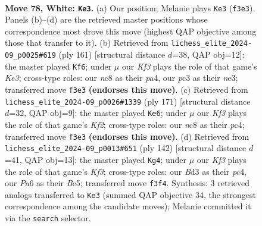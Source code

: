 \documentclass[11pt]{article}
\begin{document}
\clearpage

\begin{figure}[p]\centering
\begin{subfigure}{0.46\textwidth}\centering
\resizebox{\linewidth}{!}{%
\newchessgame
\chessboard[
  setfen={1Rnk4/r7/P1P5/7p/8/2pB1KPP/2P5/8 w - - 1 78},
  showmover=false,
  pgfstyle=straightmove, color=movearrow, markmove={f3-e3}
]}
\caption{}
\end{subfigure}\hfill
\begin{subfigure}{0.46\textwidth}\centering
\resizebox{\linewidth}{!}{%
\newchessgame
\chessboard[
  setfen={8/7p/p3k2P/R7/PP2p3/2KbN3/r7/8 b - - 3 81},
  showmover=false,
  pgfstyle=straightmove, color=movearrow, markmove={e6-f6}
]}
\caption{}
\end{subfigure}
\\[4pt]
\begin{subfigure}{0.46\textwidth}\centering
\resizebox{\linewidth}{!}{%
\newchessgame
\chessboard[
  setfen={8/p4k2/1p3bp1/3R3p/P1Pp3P/8/6K1/8 b - - 1 86},
  showmover=false,
  pgfstyle=straightmove, color=movearrow, markmove={f7-e6}
]}
\caption{}
\end{subfigure}\hfill
\begin{subfigure}{0.46\textwidth}\centering
\resizebox{\linewidth}{!}{%
\newchessgame
\chessboard[
  setfen={3R2b1/7k/8/4B1pP/2pP4/2P2K1P/5P2/4r3 w - - 3 72},
  showmover=false,
  pgfstyle=straightmove, color=movearrow, markmove={f3-g4}
]}
\caption{}
\end{subfigure}
\caption{\textbf{Move 78, White: \texttt{Ke3}.} (a) Our position; Melanie plays \texttt{Ke3} (\texttt{f3e3}). Panels (b)--(d) are the retrieved master positions whose correspondence most drove this move (highest QAP objective among those that transfer to it). (b) Retrieved from \texttt{lichess\_elite\_2024-09\_p0025\#619} (ply 161) [structural distance $d$=38, QAP obj=12]: the master played \texttt{Kf6}; under $\mu$ our \emph{Kf3} plays the role of that game's \emph{Ke3}; cross-type roles: our \emph{n}c8 as their \emph{p}a4, our \emph{p}c3 as their \emph{n}e3; transferred move \texttt{f3e3} \textbf{(endorses this move)}. (c) Retrieved from \texttt{lichess\_elite\_2024-09\_p0026\#1339} (ply 171) [structural distance $d$=32, QAP obj=9]: the master played \texttt{Ke6}; under $\mu$ our \emph{Kf3} plays the role of that game's \emph{Kf2}; cross-type roles: our \emph{n}c8 as their \emph{p}c4; transferred move \texttt{f3e3} \textbf{(endorses this move)}. (d) Retrieved from \texttt{lichess\_elite\_2024-09\_p0013\#651} (ply 142) [structural distance $d$=41, QAP obj=13]: the master played \texttt{Kg4}; under $\mu$ our \emph{Kf3} plays the role of that game's \emph{Kf3}; cross-type roles: our \emph{B}d3 as their \emph{p}c4, our \emph{P}a6 as their \emph{B}e5; transferred move \texttt{f3f4}. Synthesis: 3 retrieved analogs transferred to \texttt{Ke3} (summed QAP objective 34, the strongest correspondence among the candidate moves); Melanie committed it via the \texttt{search} selector.}
\label{fig:thought-m154}
\end{figure}
\end{document}
